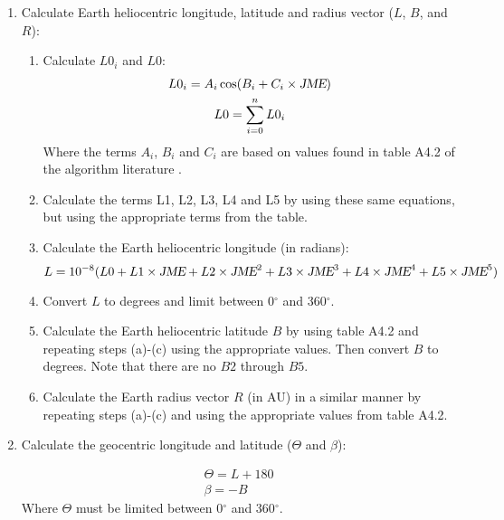 {\begin{enumerate}
\begin{enumerate}
\end{enumerate}


\item Calculate Earth heliocentric longitude, latitude and radius vector ($L$, $B$, and $R$):
  \begin{enumerate}
    \item Calculate $L0_i$ and $L0$:
    \begin{gather*}
    L0_i = A_i \cos(B_i + C_i \times \text{\sl JME}) \\
    L0 = \sum \limits_{i=0}^n L0_i
    \end{gather*}
%
    Where the terms $A_i$, $B_i$ and $C_i$ are based on values found in table A4.2 of the algorithm
    literature \cite{Reda}.

    \item Calculate the terms L1, L2, L3, L4 and L5 by using these same equations, but using the
    appropriate terms from the table.

    \item Calculate the Earth heliocentric longitude (in radians):
    \begin{displaymath}
    L = 10^{-8} (L0 + L1 \times \text{\sl JME} + L2 \times \text{\sl JME}^2 + L3 \times \text{\sl JME}^3 + L4 \times \text{\sl JME}^4 + L5 \times \text{\sl JME}^5)
    \end{displaymath}

    \item Convert $L$ to degrees and limit between 0$^\circ$ and 360$^\circ$.

    \item Calculate the Earth heliocentric latitude $B$ by using table A4.2 and repeating
    steps (a)-(c) using the appropriate values. Then convert $B$ to degrees. Note that there are no $B2$ through $B5$.

    \item Calculate the Earth radius vector $R$ (in AU) in a similar manner by repeating steps (a)-(c)
    and using the appropriate values from table A4.2.

  \end{enumerate}
  
\item Calculate the geocentric longitude and latitude ($\Theta$ and $\beta$):

\begin{gather*}
\Theta = L + 180 \\
\beta = - B 
\end{gather*}
%
Where $\Theta$ must be limited between 0$^\circ$ and 360$^\circ$.


\end{enumerate}}
